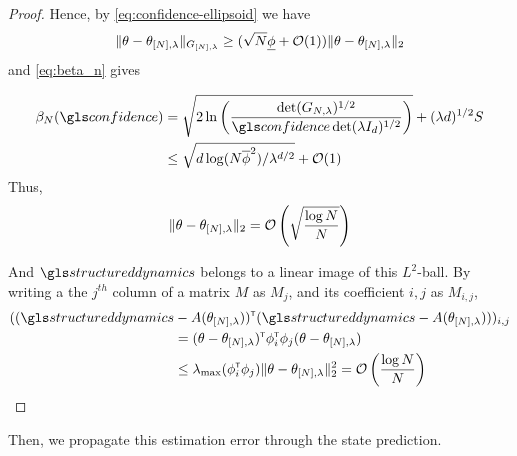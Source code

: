 \begin{subappendices}
\begin{proof}
		Hence, by \eqref{eq:confidence-ellipsoid} we have 
		\begin{align*}
		\|\theta - \theta_{[N],\lambda}\|_{G_{[N],\lambda}} \geq (\sqrt{N}\underline{\phi} + \mathcal{O}(1))\|\theta - \theta_{[N],\lambda}\|_{2}
		\end{align*}
		and \eqref{eq:beta_n} gives
		
		\begin{align*}
		\beta_N(\confidence) &= \sqrt{2\ln \left(\frac{\det(G_{N,\lambda})^{1/2}}{\confidence\det(\lambda I_d)^{1/2}}\right)}
		+ (\lambda d)^{1/2}S\\
		&\leq \sqrt{d\log (N\overline{\phi}^2) / \lambda^{d/2}} + \cO(1)
		\end{align*}
		Thus,
		\[\|\theta - \theta_{[N],\lambda}\|_{2} = \mathcal{O}\left( \sqrt{\frac{\log N}{N}} \right) \]
		
		And $\structureddynamics$ belongs to a linear image of this $L^2$-ball. By writing a the $j^{th}$ column of a matrix $M$ as $M_j$, and its coefficient $i,j$ as $M_{i,j}$,
		\begin{align*}
		((\structureddynamics&-A(\theta_{[N],\lambda}))^\transp (\structureddynamics - A(\theta_{[N],\lambda})))_{i,j}\\
		&= (\theta-\theta_{[N],\lambda})^\transp\phi_{i}^{\transp}\phi_j(\theta-\theta_{[N],\lambda}) \\
		&\leq \lambda_{\max}(\phi_{i}^{\transp}\phi_j) \|\theta - \theta_{[N],\lambda}\|_{2}^2 = \cO\left( {\frac{\log N}{N}} \right) 
		\end{align*}
		
	\end{proof}
	
	Then, we propagate this estimation error through the state prediction.
	

\end{subappendices}
